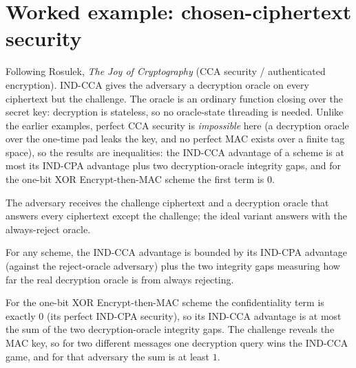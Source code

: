 \chapter{Worked example: chosen-ciphertext security}

Following Rosulek, \emph{The Joy of Cryptography} (CCA security / authenticated
encryption). IND-CCA gives the adversary a decryption oracle on every ciphertext
but the challenge. The oracle is an ordinary function closing over the secret
key: decryption is stateless, so no oracle-state threading is needed. Unlike the
earlier examples, perfect CCA security is \emph{impossible} here (a decryption
oracle over the one-time pad leaks the key, and no perfect MAC exists over a
finite tag space), so the results are inequalities: the IND-CCA advantage of a
scheme is at most its IND-CPA advantage plus two decryption-oracle integrity
gaps, and for the one-bit XOR Encrypt-then-MAC scheme the first term is $0$.

\begin{definition}
  \label{def:indcca}
  \leanok
  The adversary receives the challenge ciphertext and a decryption oracle that
  answers every ciphertext except the challenge; the ideal variant answers with
  the always-reject oracle.
\end{definition}

\begin{theorem}
  \label{thm:indcca-reduction}
  \leanok
  For any scheme, the IND-CCA advantage is bounded by its IND-CPA advantage
  (against the reject-oracle adversary) plus the two integrity gaps measuring how
  far the real decryption oracle is from always rejecting.
\end{theorem}

\begin{theorem}
  \label{thm:etm-cca}
  \leanok
  For the one-bit XOR Encrypt-then-MAC scheme the confidentiality term is exactly
  $0$ (its perfect IND-CPA security), so its IND-CCA advantage is at most the sum
  of the two decryption-oracle integrity gaps. The challenge reveals the MAC key,
  so for two different messages one decryption query wins the IND-CCA game, and
  for that adversary the sum is at least $1$.
\end{theorem}
